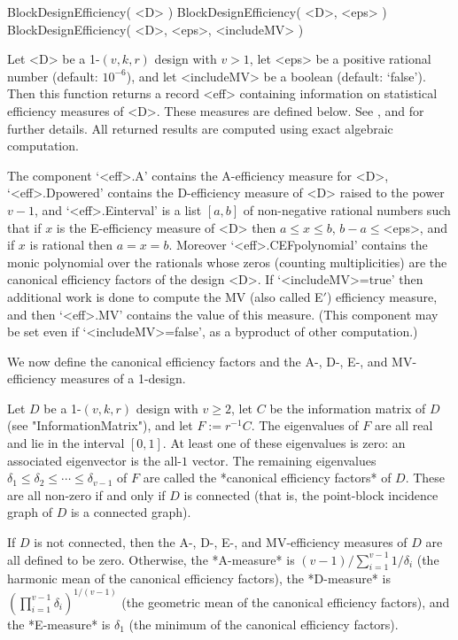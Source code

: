 
\>BlockDesignEfficiency( <D> )
\>BlockDesignEfficiency( <D>, <eps> )
\>BlockDesignEfficiency( <D>, <eps>, <includeMV> )

Let <D> be a 1-$(v,k,r)$ design with $v>1$, let <eps> be a positive
rational number (default: $10^{-6}$), and let <includeMV> be a boolean
(default: `false').  Then this function returns a record <eff> containing
information on statistical efficiency measures of <D>. These measures
are defined below.  See \cite{Extrep}, \cite{BaCa} and \cite{BaRo}
for further details.  All returned results are computed using exact
algebraic computation.

The component `<eff>.A' contains the A-efficiency measure for <D>,
`<eff>.Dpowered' contains the D-efficiency measure of <D> raised to the
power $v-1$, and `<eff>.Einterval' is a list $[a,b]$ of non-negative
rational numbers such that if $x$ is the E-efficiency measure of <D>
then $a\le x\le b$, $b-a\le$<eps>, and if $x$ is rational then $a=x=b$.
Moreover `<eff>.CEFpolynomial' contains the monic polynomial over the
rationals whose zeros (counting multiplicities) are the canonical
efficiency factors of the design <D>.  If `<includeMV>=true' then
additional work is done to compute the MV (also called E$'$) efficiency
measure, and then `<eff>.MV' contains the value of this measure. (This
component may be set even if `<includeMV>=false', as a byproduct of
other computation.)

We now define the canonical efficiency factors and the A-, D-, E-,
and MV-efficiency measures of a 1-design. 

Let $D$ be a 1-$(v,k,r)$ design with $v\ge 2$, let $C$ be the information
matrix of $D$ (see "InformationMatrix"), and let $F:=r^{-1}C$.
The eigenvalues of $F$ are all real and lie in the interval $[0,1]$.
At least one of these eigenvalues is zero: an associated eigenvector is
the all-$1$ vector. The remaining eigenvalues $\delta_1\le \delta_2\le
\cdots \le \delta_{v-1}$ of $F$ are called the *canonical efficiency
factors* of $D$. These are all non-zero if and only if $D$ is connected
(that is, the point-block incidence graph of $D$ is a connected graph).

If $D$ is not connected, then the A-, D-, E-, and MV-efficiency
measures of $D$ are all defined to be zero.  Otherwise, the
*A-measure* is $(v-1)/\sum_{i=1}^{v-1}1/\delta_i$ (the harmonic
mean of the canonical efficiency factors), the *D-measure* is
$(\prod_{i=1}^{v-1}\delta_i)^{1/(v-1)}$ (the geometric mean of the
canonical efficiency factors), and the *E-measure* is $\delta_1$ (the
minimum of the canonical efficiency factors).

